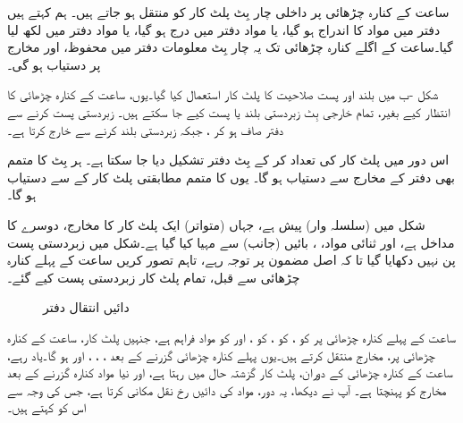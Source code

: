ساعت کے کنارہ چڑھائی پر داخلی چار بِٹ پلٹ کار کو منتقل ہو جاتے ہیں۔ ہم کہتے ہیں دفتر میں مواد کا اندراج ہو گیا، یا مواد دفتر میں درج ہو گیا، یا مواد دفتر میں لکھ لیا گیا۔ساعت کے اگلے کنارہ چڑھائی تک یہ چار بِٹ معلومات دفتر میں محفوظ، اور مخارج پر دستیاب ہو گی۔

شکل -ب میں بلند اور پست صلاحیت کا پلٹ کار استعمال کیا گیا۔یوں، ساعت کے کنارہ چڑھائی کا انتظار کیے بغیر، تمام خارجی بِٹ زبردستی بلند یا پست کیے جا سکتے ہیں۔ زبردستی پست کرنے سے دفتر صاف ہو کر ، جبکہ زبردستی بلند کرنے سے  خارج کرتا ہے۔ 

اس دور میں پلٹ کار کی تعداد  کر کے  بِٹ دفتر تشکیل دیا جا سکتا ہے۔ ہر بِٹ کا متمم بھی دفتر کے مخارج سے دستیاب ہو گا۔ یوں  کا متمم  مطابقتی پلٹ کار کے  سے دستیاب ہو گا۔ 


شکل  میں (سلسلہ وار)  پیش ہے، جہاں (متواتر) ایک پلٹ کار کا مخارج، دوسرے کا مداخل ہے، اور ثنائی مواد، ، بائیں (جانب) سے مہیا کیا گیا ہے۔شکل میں زبردستی پست پن نہیں دکھایا گیا تا کہ اصل مضمون پر توجہ رہے، تاہم تصور کریں ساعت کے پہلے کنارہ چڑھائی سے قبل، تمام پلٹ کار زبردستی پست کیے گئے۔
\begin{figure}
\centering
{}
\caption{دائیں انتقال دفتر}
\label{شکل_دفتر_دائیں_منتقل}
\end{figure}


ساعت کے پہلے کنارہ چڑھائی پر  کو ،  کو ،  کو ، اور  کو  مواد فراہم ہے، جنہیں پلٹ کار، ساعت کے کنارہ چڑھائی پر، مخارج منتقل کرتے ہیں۔یوں پہلے کنارہ چڑھائی گزرنے کے بعد ، ، ، اور  ہو گا۔یاد رہے، ساعت کے کنارہ چڑھائی کے دوران، پلٹ کار گزشتہ حال میں رہتا ہے، اور نیا مواد کنارہ گزرنے کے بعد مخارج کو پہنچتا ہے۔ آپ نے دیکھا، یہ دور، مواد کی دائیں رخ نقل مکانی کرتا ہے، جس کی وجہ سے اس کو کہتے ہیں۔ 

